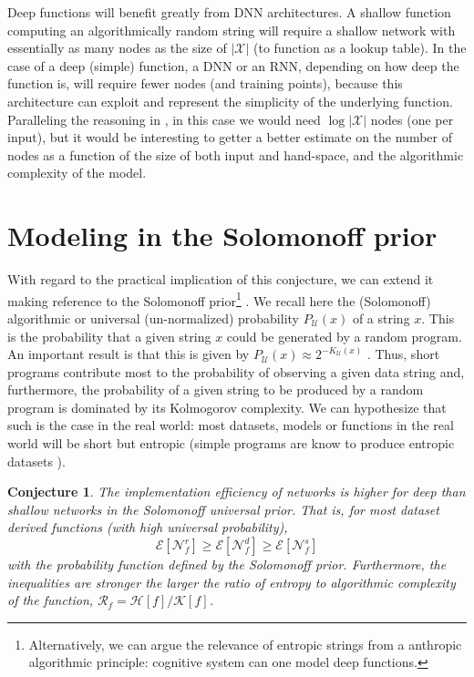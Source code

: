 \documentclass[11pt]{amsart}
\newcommand{\U}{\mathcal U}
\newcommand{\inputspace}{\mathcal X}
\newcommand{\handspace}{\mathcal H}
\newtheorem{conjecture}{Conjecture}
\begin{document}
Deep functions will benefit greatly from DNN architectures. A shallow function computing an algorithmically random string will require a shallow network with essentially as many nodes as the size of $|\inputspace|$ (to function as  a lookup table). In the case of a deep (simple) function, a DNN or an RNN, depending on how deep the function is, will require fewer nodes (and training points), because this architecture can exploit and represent the simplicity of the underlying function.  Paralleling the reasoning in \cite{Mhaskar:2016aa}, in this case we would need $\log |\inputspace|$ nodes (one per input), but it would be interesting to getter a better estimate on the number of nodes  as a function of the size of both input and hand-space, and the algorithmic complexity of the model. 

\section{Modeling in the Solomonoff prior}

With regard to the practical implication of this conjecture,  we can extend it  making reference to the Solomonoff prior\footnote{ Alternatively, we can argue the relevance of entropic strings from a anthropic algorithmic principle: cognitive system can one model deep functions.} \cite{Cover:2006aa}. We recall here the  (Solomonoff)  algorithmic or universal (un-normalized) probability $P_\U(x)$ of a string $x$. This is the probability that a given string $x$ could be generated by a random program. An important result is that this is given by 
$ P_\U(x)
\approx 2^{-K_\U(x)}$  \cite{Li:2008aa}.
Thus,  short programs contribute most to the probability of observing a given data string and, furthermore,   the probability of a given string to be produced by a random program is dominated by its Kolmogorov complexity.  We can hypothesize that such is the case in the real world: most datasets, models or functions in the real world will be short but entropic (simple programs are know to produce entropic datasets \cite{Wolfram:2002aa}).


\begin{conjecture}
The implementation efficiency of networks is higher for deep than shallow networks in the Solomonoff universal prior. That is, for most dataset derived functions (with high universal probability), 
$$
\mathcal E[\mathcal N^{r}_{f}]   \ge   \mathcal E[\mathcal N^{d}_{f}]  \ge \mathcal E[\mathcal N^{s}_{f}] 
$$
with the probability function defined by the Solomonoff prior.
Furthermore, the inequalities are stronger the larger the ratio of  entropy to algorithmic complexity of the function, $ \mathcal R_{f}=  \handspace[f] / \mathcal K[f] $.
\end{conjecture}
\end{document}
